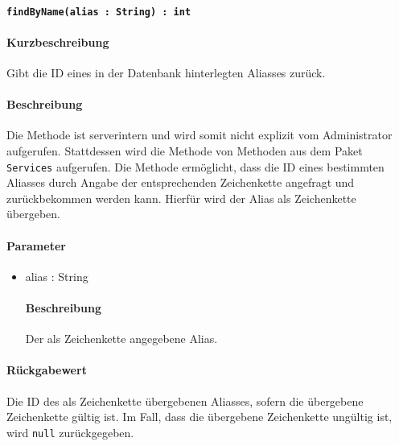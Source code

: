 \paragraph{\texttt{findByName(alias : String) : int}}%
\paragraph*{Kurzbeschreibung}
Gibt die ID eines in der Datenbank hinterlegten Aliasses zurück.
\paragraph*{Beschreibung}
Die Methode ist serverintern und wird somit nicht explizit vom Administrator aufgerufen.
Stattdessen wird die Methode von Methoden aus dem Paket \texttt{Services} aufgerufen.
Die Methode ermöglicht, dass die ID eines bestimmten Aliasses durch Angabe der entsprechenden Zeichenkette angefragt und zurückbekommen werden kann.
Hierfür wird der Alias als Zeichenkette übergeben.
\paragraph*{Parameter}
\begin{itemize}
    \item alias : String
    		\paragraph*{Beschreibung}
    		Der als Zeichenkette angegebene Alias.
\end{itemize}
\paragraph*{Rückgabewert}
Die ID des als Zeichenkette übergebenen Aliasses, sofern die übergebene Zeichenkette gültig ist.
Im Fall, dass die übergebene Zeichenkette ungültig ist, wird \texttt{null} zurückgegeben.
